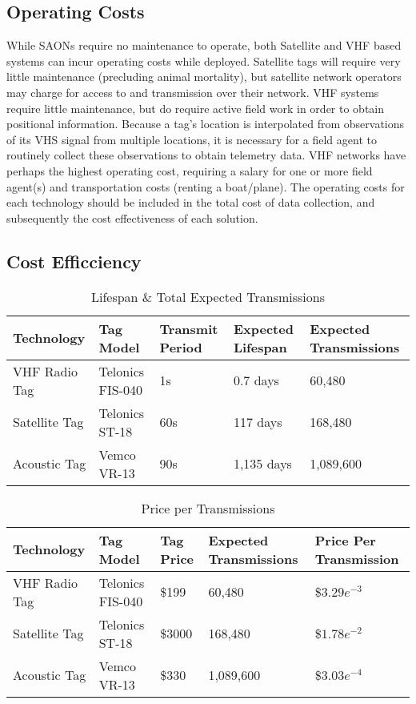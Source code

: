 \subsection{Operating Costs}
While SAONs require no maintenance to operate, both Satellite and VHF based systems can incur operating costs while deployed.  Satellite tags will require very little maintenance (precluding animal mortality), but satellite network operators may charge for access to and transmission over their network\cite{wildlifetracking}.  VHF systems require little maintenance, but do require active field work in order to obtain positional information.  Because a tag's location is interpolated from observations of its VHS signal from multiple locations, it is necessary for a field agent to routinely collect these observations to obtain telemetry data.  VHF networks have perhaps the highest operating cost, requiring a salary for one or more field agent(s) and transportation costs (renting a boat/plane).  The operating costs for each technology should be included in the total cost of data collection, and subsequently the cost effectiveness of each solution.
  
  


\subsection{Cost Efficciency}
\begin{table}[h!]
	\label{ExpectedLife&Tx}
	\begin{tabular}{l l l l l}
		Technology&Tag Model&Transmit Period&Expected Lifespan&Expected Transmissions\\
		\hline
		VHF Radio Tag		& Telonics FIS-040	& 1s	& 0.7 days	    & 60,480\\
		Satellite Tag		& Telonics ST-18	& 60s	& 117 days		& 168,480\\
		Acoustic Tag		& Vemco VR-13		& 90s	& 1,135 days	& 1,089,600\\
	\end{tabular}
\caption{Lifespan \& Total Expected Transmissions}
\end{table}



\begin{table}[h!]
	\begin{tabular}{l l l l l}
		Technology&Tag Model&Tag Price&Expected Transmissions&Price Per Transmission\\
		\hline
		VHF Radio Tag		& Telonics FIS-040	& \$199		& 60,480	& \$$3.29e^{-3}$\\
		Satellite Tag		& Telonics ST-18	& \$3000	& 168,480	& \$$1.78e^{-2}$\\
		Acoustic Tag		& Vemco VR-13		& \$330		& 1,089,600	& \$$3.03e^{-4}$\\
	\end{tabular}
	\caption{Price per Transmissions}
	\label{PricePerTx}
\end{table}


